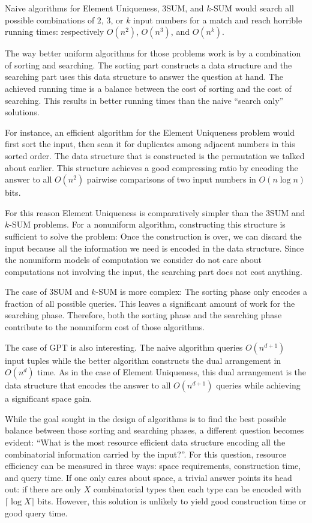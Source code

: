 Naive algorithms for Element Uniqueness, 3SUM, and \(k\)-SUM would search
all possible combinations of \(2\), \(3\), or \(k\) input numbers for a match
and reach horrible running times: respectively \(O(n^2)\), \(O(n^3)\), and \(O(n^k)\).

The way better uniform algorithms for those problems work
is by a combination of sorting and searching. The sorting part
constructs a data structure and the searching part uses this data structure to
answer the question at hand. The achieved running time is a balance between the
cost of sorting and the cost of searching. This results in better
running times than the naive ``search only'' solutions.

For instance, an efficient algorithm for the
Element Uniqueness problem would first sort the input, then scan it for
duplicates among adjacent numbers in this sorted order. The data structure that
is constructed is the permutation we talked about earlier. This structure
achieves a good compressing ratio by encoding the answer to all \(O(n^2)\)
pairwise comparisons of two input numbers in \(O(n \log n)\) bits.

For this reason Element Uniqueness is comparatively simpler than the 3SUM and
\(k\)-SUM problems.
For a nonuniform algorithm, constructing this structure is sufficient to solve
the problem: Once the construction is over, we can discard the input because
all the information we need is encoded in the data structure. Since the nonuniform
models of computation we consider do not care about computations not involving
the input, the searching part does not cost anything.

The case of 3SUM and \(k\)-SUM is more complex: The sorting phase only encodes
a fraction of all possible queries. This leaves a significant amount of work
for the searching phase. Therefore, both the sorting phase and the searching
phase contribute to the nonuniform cost of those algorithms.

The case of GPT is also interesting. The naive algorithm queries
\(O(n^{d+1})\) input tuples while the better algorithm constructs the dual
arrangement in \(O(n^d)\) time.
As in the case of Element Uniqueness,
this dual arrangement is the data structure that encodes the answer to all
\(O(n^{d+1})\) queries while achieving a significant space gain.

While the goal sought in the design of algorithms is to find the best possible
balance between those sorting and searching phases, a different question becomes
evident: ``What is the most resource efficient data structure encoding all the
combinatorial information carried by the input?''. For this question, resource
efficiency can be measured in three ways: space requirements, construction
time, and query time. If one only cares about space, a trivial answer
points its head out: if there are only \(X\) combinatorial types then each type
can be encoded with \(\lceil \log X \rceil\) bits. However, this solution is
unlikely to yield good construction time or good query time.


